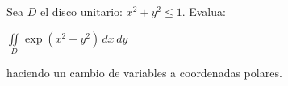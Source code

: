 \noindent Sea $D$ el disco unitario: $x^2+y^2 \leq 1$. Evalua:

\begin{center}
    $\displaystyle\iint\limits_D \exp(x^2 + y^2) \, dx \, dy$
\end{center}

\noindent haciendo un cambio de variables a coordenadas polares.

